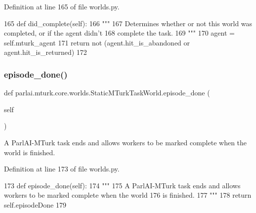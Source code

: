 Definition at line 165 of file worlds.\+py.


\begin{DoxyCode}
165     \textcolor{keyword}{def }did\_complete(self):
166         \textcolor{stringliteral}{"""}
167 \textcolor{stringliteral}{        Determines whether or not this world was completed, or if the agent didn't}
168 \textcolor{stringliteral}{        complete the task.}
169 \textcolor{stringliteral}{        """}
170         agent = self.mturk\_agent
171         \textcolor{keywordflow}{return} \textcolor{keywordflow}{not} (agent.hit\_is\_abandoned \textcolor{keywordflow}{or} agent.hit\_is\_returned)
172 
\end{DoxyCode}
\mbox{\label{classparlai_1_1mturk_1_1core_1_1worlds_1_1StaticMTurkTaskWorld_a07853455a3ffdc3d7142331c1d74649c}} 
\subsubsection{\texorpdfstring{episode\+\_\+done()}{episode\_done()}}
{\footnotesize\ttfamily def parlai.\+mturk.\+core.\+worlds.\+Static\+M\+Turk\+Task\+World.\+episode\+\_\+done (\begin{DoxyParamCaption}\item[{}]{self }\end{DoxyParamCaption})}

\begin{DoxyVerb}A ParlAI-MTurk task ends and allows workers to be marked complete when the world
is finished.
\end{DoxyVerb}
 

Definition at line 173 of file worlds.\+py.


\begin{DoxyCode}
173     \textcolor{keyword}{def }episode\_done(self):
174         \textcolor{stringliteral}{"""}
175 \textcolor{stringliteral}{        A ParlAI-MTurk task ends and allows workers to be marked complete when the world}
176 \textcolor{stringliteral}{        is finished.}
177 \textcolor{stringliteral}{        """}
178         \textcolor{keywordflow}{return} self.episodeDone
179 
\end{DoxyCode}
\mbox{\label{classparlai_1_1mturk_1_1core_1_1worlds_1_1StaticMTurkTaskWorld_a83e09ea1d4ae320941d72b7c72897d3b}} 
